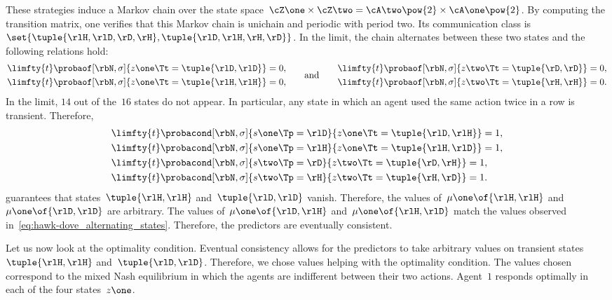These strategies induce a Markov chain over the state space~\(\cZ\one \times \cZ\two = \cA\two\pow{2} \times \cA\one\pow{2}\).
By computing the transition matrix, one verifies that this Markov chain is unichain and periodic with period two.
Its communication class is~\(\set{\tuple{\rlH, \rlD, \rD, \rH}, \tuple{\rlD, \rlH, \rH, \rD}}\).
In the limit, the chain alternates between these two states and the following relations hold:
\begin{equation}
\label{eq:hawk-dove_unseen_states}
\begin{aligned}
&\limfty{t} \probaof[\rbN, \sigma]{z\one\Tt = \tuple{\rlD, \rlD}} = 0, \\
&\limfty{t} \probaof[\rbN, \sigma]{z\one\Tt = \tuple{\rlH, \rlH}} = 0,
\end{aligned}
\qquad\text{and}\qquad
\begin{aligned}
&\limfty{t} \probaof[\rbN, \sigma]{z\two\Tt = \tuple{\rD, \rD}} = 0, \\
&\limfty{t} \probaof[\rbN, \sigma]{z\two\Tt = \tuple{\rH, \rH}} = 0.
\end{aligned}
\end{equation}
In the limit, \(14\) out of the~\(16\) states do not appear.
In particular, any state in which an agent used the same action twice in a row is transient.
Therefore,
\begin{equation}
\label{eq:hawk-dove_alternating_states}
\begin{aligned}
&\limfty{t} \probacond[\rbN, \sigma]{s\one\Tp = \rlD}{z\one\Tt = \tuple{\rlD, \rlH}} = 1, \\
&\limfty{t} \probacond[\rbN, \sigma]{s\one\Tp = \rlH}{z\one\Tt = \tuple{\rlH, \rlD}} = 1, \\
&\limfty{t} \probacond[\rbN, \sigma]{s\two\Tp = \rD}{z\two\Tt = \tuple{\rD, \rH}} = 1, \\
&\limfty{t} \probacond[\rbN, \sigma]{s\two\Tp = \rH}{z\two\Tt = \tuple{\rH, \rD}} = 1.
\end{aligned}
\end{equation}
 guarantees that states~\(\tuple{\rlH, \rlH}\) and~\(\tuple{\rlD, \rlD}\) vanish.
Therefore, the values of~\(\mu\one \of{\rlH, \rlH}\) and~\(\mu\one \of{\rlD, \rlD}\) are arbitrary.
The values of~\(\mu\one \of{\rlD, \rlH}\) and~\(\mu\one \of{\rlH, \rlD}\) match the values observed in~\cref{eq:hawk-dove_alternating_states}.
Therefore, the predictors are eventually consistent.

Let us now look at the optimality condition.
Eventual consistency allows for the predictors to take arbitrary values on transient states~\(\tuple{\rlH,\rlH}\) and~\(\tuple{\rlD,\rlD}\).
Therefore, we chose values helping with the optimality condition.
The values chosen correspond to the mixed Nash equilibrium in which the agents are indifferent between their two actions.
Agent~\(1\) responds optimally in each of the four states~\(z\one\).

